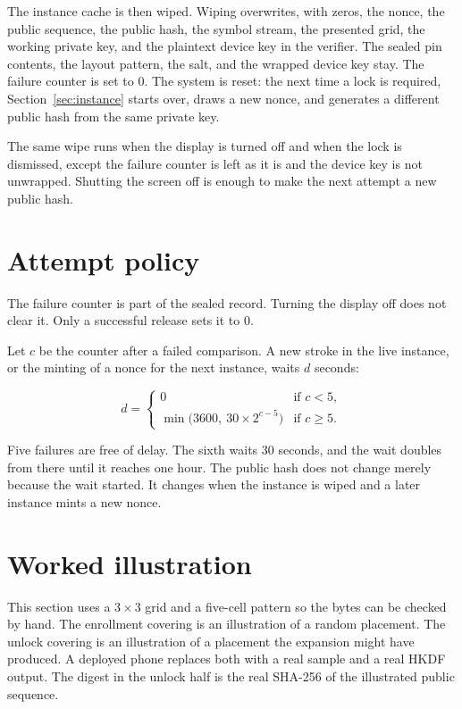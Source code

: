 \documentclass[11pt]{article}
\begin{document}
The instance cache is then wiped.
Wiping overwrites, with zeros, the nonce, the public sequence, the public hash, the symbol stream, the presented grid, the working private key, and the plaintext device key in the verifier.
The sealed pin contents, the layout pattern, the salt, and the wrapped device key stay.
The failure counter is set to \(0\).
The system is reset: the next time a lock is required, Section~\ref{sec:instance} starts over, draws a new nonce, and generates a different public hash from the same private key.

The same wipe runs when the display is turned off and when the lock is dismissed, except the failure counter is left as it is and the device key is not unwrapped.
Shutting the screen off is enough to make the next attempt a new public hash.

\section{Attempt policy}
\label{sec:policy}

The failure counter is part of the sealed record.
Turning the display off does not clear it.
Only a successful release sets it to \(0\).

Let \(c\) be the counter after a failed comparison.
A new stroke in the live instance, or the minting of a nonce for the next instance, waits \(d\) seconds:

\[
d =
\begin{cases}
0 & \text{if } c < 5, \\
\min\bigl(3600,\ 30 \times 2^{c-5}\bigr) & \text{if } c \ge 5.
\end{cases}
\]

Five failures are free of delay.
The sixth waits \(30\) seconds, and the wait doubles from there until it reaches one hour.
The public hash does not change merely because the wait started.
It changes when the instance is wiped and a later instance mints a new nonce.

\section{Worked illustration}

This section uses a \(3 \times 3\) grid and a five-cell pattern so the bytes can be checked by hand.
The enrollment covering is an illustration of a random placement.
The unlock covering is an illustration of a placement the expansion might have produced.
A deployed phone replaces both with a real sample and a real HKDF output.
The digest in the unlock half is the real SHA-256 of the illustrated public sequence.
\end{document}
